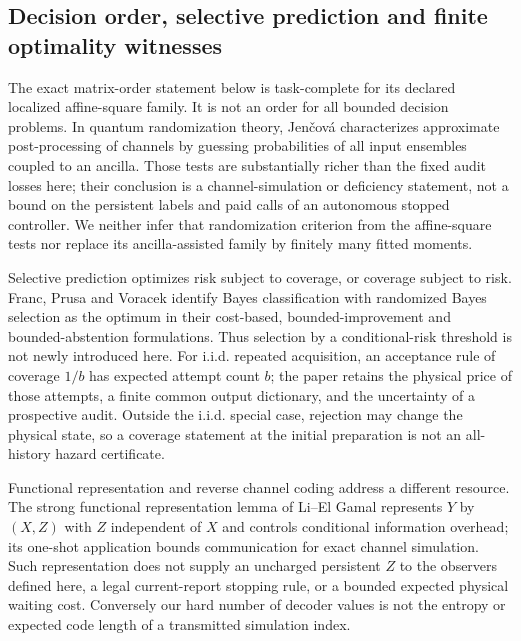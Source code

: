 \subsection*{Decision order, selective prediction and finite optimality witnesses}
The exact matrix-order statement below is task-complete for its declared localized affine-square family. It is not an order for all bounded decision problems. In quantum randomization theory, Jen\v{c}ov\'a \cite{Jencova16} characterizes approximate post-processing of channels by guessing probabilities of all input ensembles coupled to an ancilla. Those tests are substantially richer than the fixed audit losses here; their conclusion is a channel-simulation or deficiency statement, not a bound on the persistent labels and paid calls of an autonomous stopped controller. We neither infer that randomization criterion from the affine-square tests nor replace its ancilla-assisted family by finitely many fitted moments.

Selective prediction optimizes risk subject to coverage, or coverage subject to risk. Franc, Prusa and Voracek \cite{Franc23} identify Bayes classification with randomized Bayes selection as the optimum in their cost-based, bounded-improvement and bounded-abstention formulations. Thus selection by a conditional-risk threshold is not newly introduced here. For i.i.d. repeated acquisition, an acceptance rule of coverage $1/b$ has expected attempt count $b$; the paper retains the physical price of those attempts, a finite common output dictionary, and the uncertainty of a prospective audit. Outside the i.i.d. special case, rejection may change the physical state, so a coverage statement at the initial preparation is not an all-history hazard certificate.

Functional representation and reverse channel coding address a different resource. The strong functional representation lemma of Li--El Gamal \cite[Theorem 1]{LiElGamal18} represents $Y$ by $(X,Z)$ with $Z$ independent of $X$ and controls conditional information overhead; its one-shot application bounds communication for exact channel simulation. Such representation does not supply an uncharged persistent $Z$ to the observers defined here, a legal current-report stopping rule, or a bounded expected physical waiting cost. Conversely our hard number of decoder values is not the entropy or expected code length of a transmitted simulation index.

